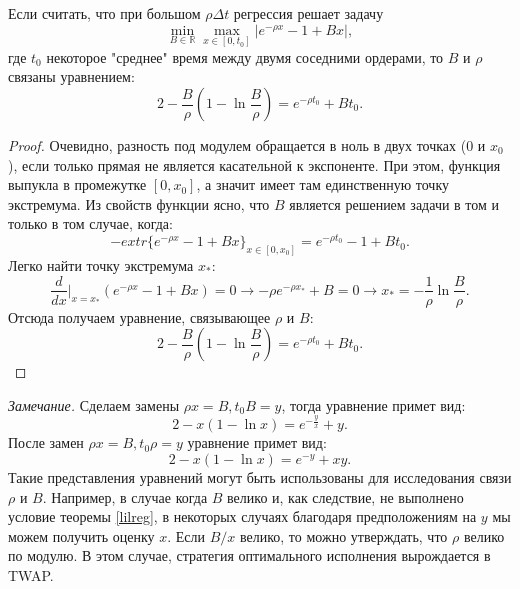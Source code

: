 \begin{appendices}
        \begin{theorem}
                Если считать, что при большом $\rho \Delta t$ регрессия решает задачу
                \begin{equation*}
                        \min _{B \in \mathbb{R}} \max _{x \in [0, t_0]} |e^{- \rho x} - 1 + B x|,
                \end{equation*} 
                где $t_0$ некоторое "среднее" время между двумя соседними ордерами, то $B$ и $\rho$ связаны уравнением:
                \begin{equation*}
                        2 - \frac{B}{\rho}\left(1 - \ln \frac{B}{\rho}\right) = e^{- \rho t_0} + B t_0.
                \end{equation*} 
        \end{theorem}
        \begin{proof}
        Очевидно, разность под модулем обращается в ноль в двух точках ($0$ и $x_0$), если только прямая не является касательной к экспоненте.
        При этом, функция выпукла в промежутке $[0, x_0]$, а значит имеет там единственную точку экстремума. Из свойств функции ясно, что $B$ 
        является решением задачи в том и только в том случае, когда:
        \begin{equation*}
                - extr \{e^{-\rho x} - 1 + B x \}_{x \in [0, x_0]} = e^{-\rho t_0} - 1 + B t_0.
        \end{equation*} 
        Легко найти точку экстремума $x_*$:
        \begin{equation*}
                \frac{d}{dx} \Big| _{x=x_*} (e^{-\rho x} - 1 + B x) = 0 \rightarrow -\rho e^{-\rho x_*} + B = 0 \rightarrow x_* = -\frac{1}{\rho} \ln \frac{B}{\rho}.
        \end{equation*} 
        Отсюда получаем уравнение, связывающее $\rho$ и $B$:
        \begin{equation*}
                2 - \frac{B}{\rho}\left(1 - \ln \frac{B}{\rho}\right) = e^{- \rho t_0} + B t_0.
        \end{equation*} 
        \end{proof}
        \textit{Замечание.} Сделаем замены $\rho x = B, t_0 B = y$, тогда уравнение примет вид:
        \begin{equation*}
                2 - x \left(1 - \ln x\right) = e^{- \frac{y}{x}} + y.
        \end{equation*} 
        После замен $\rho x = B, t_0 \rho = y$ уравнение примет вид:
        \begin{equation*}
                2 - x \left(1 - \ln x\right) = e^{- y} + x y.
        \end{equation*} 
        Такие представления уравнений могут быть использованы для исследования связи $\rho$ и $B$. Например, в случае когда $B$ велико и,
        как следствие, не выполнено условие теоремы \ref{lilreg}, в некоторых случаях благодаря предположениям на $y$ мы можем получить оценку
        $x$. Если $B / x$ велико, то можно утверждать, что $\rho$ велико по модулю. В этом случае, стратегия оптимального исполнения вырождается в
        TWAP.



\end{appendices}
